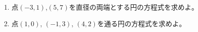 \documentclass[8pt,dvipdfmx]{article}[b5paper]
\begin{document}
\begin{tcolorbox}[title=数学\textcircled{1} 4- 4 AB]
\begin{enumerate}[(1)]
    \item 点$(-3,1)$,$(5,7)$を直径の両端とする円の方程式を求めよ。
    \item 点$(1, 0)$, $(-1,3)$, $(4,2)$を通る円の方程式を求めよ。
\end{enumerate}
\end{tcolorbox}
\end{document}
